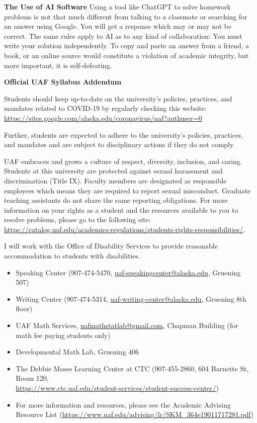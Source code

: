 \documentclass[12pt]{article}
\def\mailto#1{\href{mailto:#1}{#1}}
\begin{document}
\textbf{The Use of AI Software}
Using a tool like ChatGPT to solve homework problems is not that much different from talking to a classmate or searching for an answer using Google. You will get a response which may or may not be correct. The same rules apply to AI as to any kind of collaboration: You must write your solution independently. To copy and paste an answer from a friend, a book, or an online source would constitute a violation of academic integrity, but more important, it is self-defeating.

\begin{center}\textbf{\large{Official UAF Syllabus Addendum}}\end{center}

 Students should keep up-to-date on the university's policies, practices, and mandates related to COVID-19 by regularly checking this website: \url{https://sites.google.com/alaska.edu/coronavirus/uaf?authuser=0}

Further, students are expected to adhere to the university's policies, practices, and mandates and are subject to disciplinary actions if they do not comply.

 UAF embraces and grows a culture of respect, diversity, inclusion, and caring. Students at this university are protected against sexual harassment and discrimination (Title IX). Faculty members are designated as responsible employees which means they are required to report sexual misconduct. Graduate teaching assistants do not share the same reporting obligations. For more information on your rights as a student and the resources available to you to resolve problems, please go to the following site: \url{https://catalog.uaf.edu/academics-regulations/students-rights-responsibilities/}.

 I will work with the Office of Disability Services to provide reasonable accommodation to students with disabilities.

\begin{itemize}
\setlength\itemsep{0em}
        \item Speaking Center (907-474-5470,
        \mailto{uaf-speakingcenter@alaska.edu}, Gruening 507)
\item Writing Center (907-474-5314, \mailto{uaf-writing-center@alaska.edu}, Gruening 8th floor)
\item UAF Math Services, \mailto{uafmathstatlab@gmail.com}, Chapman Building (for math fee paying students only)
\item Developmental Math Lab, Gruening 406
\item The Debbie Moses Learning Center at CTC (907-455-2860, 604 Barnette St, Room 120,\\ \mailto{https://www.ctc.uaf.edu/student-services/student-success-center/})
\item For more information and resources, please see the Academic Advising Resource List (\url{https://www.uaf.edu/advising/lr/SKM_364e19011717281.pdf})
\end{itemize}
\end{document}
